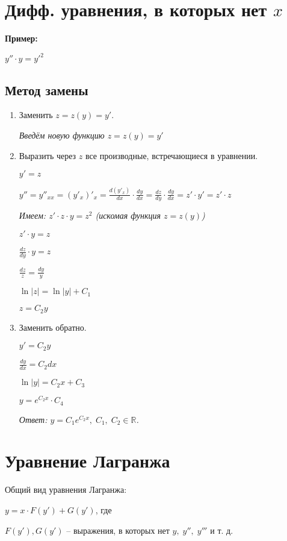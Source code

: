 \documentclass[10pt, a4paper]{article}
\begin{document}
\section{Дифф. уравнения, в которых нет $x$}
\textbf{Пример:}
\par $y'' \cdot y = y'^{2}$
\subsection{Метод замены}
\begin{enumerate}
    \item Заменить $z = z(y) = y'$.
        \par\textit{Введём новую функцию $z = z(y) = y'$}
    \item Выразить через $z$ все производные, встречающиеся в уравнении.
        \par $y' = z$
        \par $y'' = y''_{xx} = (y'_{x})'_{x} = \frac{d(y'_{x})}{dx}  \cdot  \frac{dy}{dx} = \frac{dz}{dy}  \cdot  \frac{dy}{dx} = z' \cdot y' = z' \cdot z$
        \par\textit{Имеем: $z' \cdot z \cdot y = z^2$ (искомая функция $z = z(y)$)}
        \par $z' \cdot y = z$
        \par $\frac{dz}{dy} \cdot y = z$
        \par $\frac{dz}{z} = \frac{dy}{y}$
        \par $\ln|z| = \ln|y| + C_{1}$
        \par $z = C_{2}y$
    \item Заменить обратно.
        \par $y' = C_{2}y$
        \par $\frac{dy}{dx} = C_{2}dx$
        \par $\ln|y| = C_{2}x + C_{3}$
        \par $y = e^{C_2{x}}  \cdot  C_4$
        \par\textit{Ответ: $y = C_1e^{C_2x}, \; C_1, \; C_2 \in \mathbb{R}$.}
\end{enumerate}


\section{Уравнение Лагранжа}
Общий вид уравнения Лагранжа:
\par $y = x \cdot F(y') + G(y')$, где
\par $F(y'), G(y')$ -- выражения, в которых нет $y, \; y'', \; y'''$ и т. д.
\end{document}
